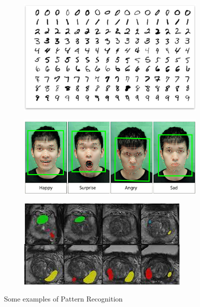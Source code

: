 \begin{itemize}
          \begin{figure}[h]
              \centering
              \begin{subfigure}{0.3\textwidth}
                  \centering
                  \includegraphics[width=\textwidth]{../img/Handwritten_digits}
              \end{subfigure}
              \hfill
              \begin{subfigure}{0.3\textwidth}
                  \centering
                  \includegraphics[width=\textwidth, height=0.55\textwidth]{../img/Facial_expr}
              \end{subfigure}
              \hfill
              \begin{subfigure}{0.3\textwidth}
                  \centering
                  \includegraphics[width=\textwidth]{../img/Medical_img}
              \end{subfigure}
              \caption{Some examples of Pattern Recognition}
          \end{figure}


\end{itemize}
